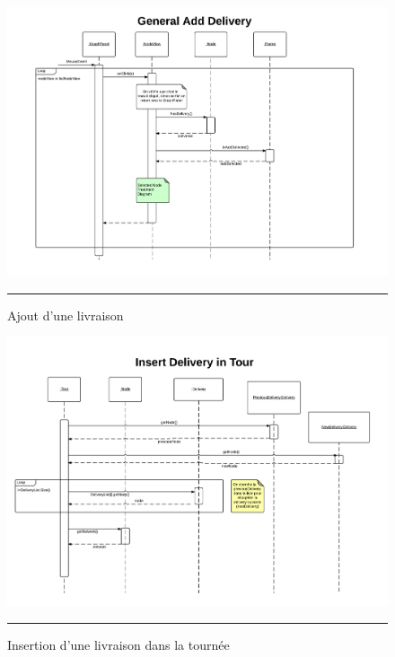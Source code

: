 \clearpage
\begin{figure}[H]
	\centering
		\includegraphics[width=\textwidth,height=\textheight,keepaspectratio, angle=90]{Figures/ajout_livraison4}
		\rule{35em}{0.5pt}
	\caption[Ajout d'une livraison]{Ajout d'une livraison}
\end{figure}
\clearpage

\begin{figure}[H]
	\centering
		\includegraphics[width=\textwidth,height=\textheight,keepaspectratio, angle=90]{Figures/ajout_livraison5}
		\rule{35em}{0.5pt}
	\caption[Insertion d'une livraison dans la tournée]{Insertion d'une livraison dans la tournée}
\end{figure}
\clearpage

